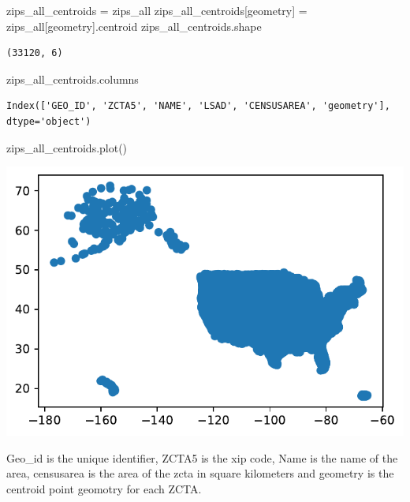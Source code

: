 \documentclass[
  letterpaper,
  DIV=11,
  numbers=noendperiod]{scrartcl}
\newenvironment{Shaded}{\begin{snugshade}}{\end{snugshade}}
\newcommand{\NormalTok}[1]{\textcolor[rgb]{0.00,0.23,0.31}{#1}}
\newcommand{\OperatorTok}[1]{\textcolor[rgb]{0.37,0.37,0.37}{#1}}
\newcommand{\StringTok}[1]{\textcolor[rgb]{0.13,0.47,0.30}{#1}}
\begin{document}
\begin{Shaded}
\begin{Highlighting}[]
\NormalTok{zips\_all\_centroids }\OperatorTok{=}\NormalTok{ zips\_all}
\NormalTok{zips\_all\_centroids[}\StringTok{\textquotesingle{}geometry\textquotesingle{}}\NormalTok{] }\OperatorTok{=}\NormalTok{ zips\_all[}\StringTok{\textquotesingle{}geometry\textquotesingle{}}\NormalTok{].centroid}
\NormalTok{zips\_all\_centroids.shape}
\end{Highlighting}
\end{Shaded}

\begin{verbatim}
(33120, 6)
\end{verbatim}

\begin{Shaded}
\begin{Highlighting}[]
\NormalTok{zips\_all\_centroids.columns}
\end{Highlighting}
\end{Shaded}

\begin{verbatim}
Index(['GEO_ID', 'ZCTA5', 'NAME', 'LSAD', 'CENSUSAREA', 'geometry'], dtype='object')
\end{verbatim}

\begin{Shaded}
\begin{Highlighting}[]
\NormalTok{zips\_all\_centroids.plot()}
\end{Highlighting}
\end{Shaded}

\includegraphics{ps4_files/figure-pdf/cell-20-output-1.pdf}

Geo\_id is the unique identifier, ZCTA5 is the xip code, Name is the
name of the area, censusarea is the area of the zcta in square
kilometers and geometry is the centroid point geomotry for each ZCTA.
\end{document}
